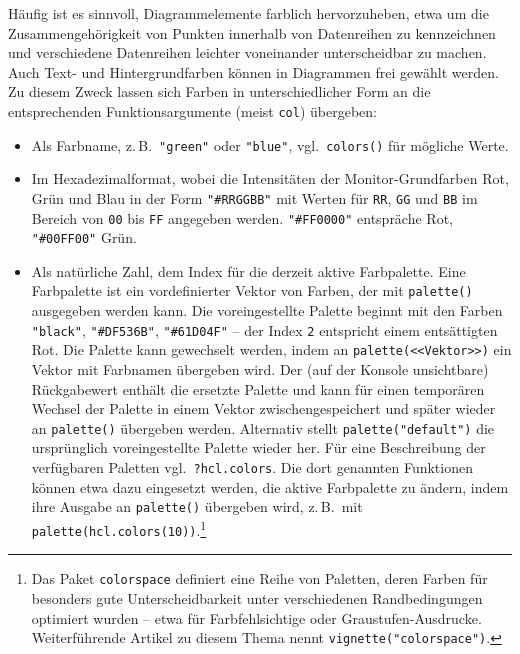 Häufig ist es sinnvoll, Diagrammelemente farblich hervorzuheben, etwa um die Zusammengehörigkeit von Punkten innerhalb von Datenreihen zu kennzeichnen und verschiedene Datenreihen leichter voneinander unterscheidbar zu machen. Auch Text- und Hintergrundfarben können in Diagrammen frei gewählt werden. Zu diesem Zweck lassen sich Farben in unterschiedlicher Form an die entsprechenden Funktionsargumente (meist \lstinline!col!) übergeben:

\begin{itemize}
\item Als Farbname, z.\,B.\ \lstinline!"green"! oder \lstinline!"blue"!, vgl.\ \lstinline!colors()! für mögliche Werte.
\item Im Hexadezimalformat, wobei die Intensitäten der Monitor-Grundfarben Rot, Grün und Blau in der Form \lstinline!"#RRGGBB"! mit Werten für \lstinline!RR!, \lstinline!GG! und \lstinline!BB! im Bereich von \lstinline!00! bis \lstinline!FF! angegeben werden. \lstinline!"#FF0000"! entspräche Rot, \lstinline!"#00FF00"! Grün.
\item Als natürliche Zahl, dem Index für die derzeit aktive Farbpalette. Eine Farbpalette ist ein vordefinierter Vektor von Farben, der mit \lstinline!palette()! ausgegeben werden kann. Die voreingestellte Palette beginnt mit den Farben \lstinline!"black"!, \lstinline!"#DF536B"!, \lstinline!"#61D04F"! -- der Index \lstinline!2! entspricht einem entsättigten Rot. Die Palette kann gewechselt werden, indem an \lstinline!palette(<<Vektor>>)! ein Vektor mit Farbnamen übergeben wird. Der (auf der Konsole unsichtbare) Rückgabewert enthält die ersetzte Palette und kann für einen temporären Wechsel der Palette in einem Vektor zwischengespeichert und später wieder an \lstinline!palette()! übergeben werden. Alternativ stellt \lstinline!palette("default")! die ursprünglich voreingestellte Palette wieder her. Für eine Beschreibung der verfügbaren Paletten vgl.\ \lstinline!?hcl.colors!. Die dort genannten Funktionen können etwa dazu eingesetzt werden, die aktive Farbpalette zu ändern, indem ihre Ausgabe an \lstinline!palette()! übergeben wird, z.\,B.\ mit \lstinline!palette(hcl.colors(10))!.\footnote{Das Paket  \lstinline!colorspace! \cite{Zeileis2019, Ihaka2009} definiert eine Reihe von Paletten, deren Farben für besonders gute Unterscheidbarkeit unter verschiedenen Randbedingungen optimiert wurden -- etwa für Farbfehlsichtige oder Graustufen-Ausdrucke. Weiterführende Artikel zu diesem Thema nennt \lstinline!vignette("colorspace")!.}
\end{itemize}


